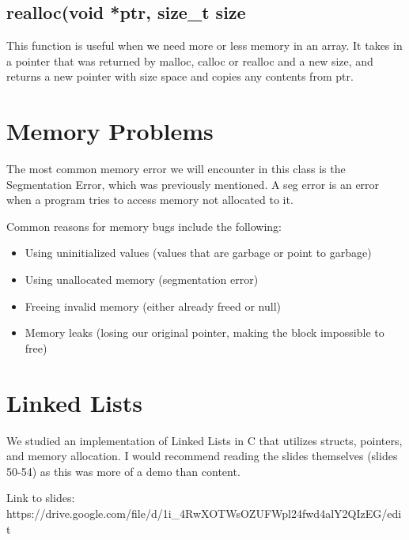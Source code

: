 \documentclass[letterpaper]{article}
\theoremstyle{remark}
\begin{document}
\subsection{realloc(void *ptr, size_t size}
This function is useful when we need more or less memory in an array. It takes in a pointer that was returned by malloc, calloc or realloc and a new size, and returns a new pointer with size space and copies any contents from ptr.

\section{Memory Problems}
The most common memory error we will encounter in this class is the Segmentation Error, which was previously mentioned. A seg error is an error when a program tries to access memory not allocated to it.

Common reasons for memory bugs include the following:
\begin{itemize}
    \item Using uninitialized values (values that are garbage or point to garbage)
    \item Using unallocated memory (segmentation error)
    \item Freeing invalid memory (either already freed or null)
    \item Memory leaks (losing our original pointer, making the block impossible to free)
\end{itemize}

\section{Linked Lists}
We studied an implementation of Linked Lists in C that utilizes structs, pointers, and memory allocation. I would recommend reading the slides themselves (slides 50-54) as this was more of a demo than content. 

Link to slides: https://drive.google.com/file/d/1i\_4RwXOTWsOZUFWpl24fwd4alY2QIzEG/edit
\end{document}
